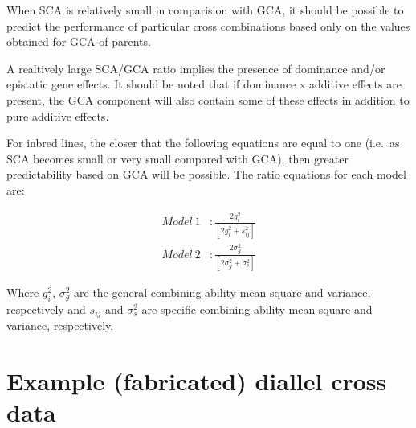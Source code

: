 \documentclass[11pt,dvipsnames,ignorenonframetext,aspectratio=169]{beamer}
\begin{document}
\begin{frame}{}
\protect\hypertarget{section-15}{}
\footnotesize

When SCA is relatively small in comparision with GCA, it should be
possible to predict the performance of particular cross combinations
based only on the values obtained for GCA of parents.

A realtively large SCA/GCA ratio implies the presence of dominance
and/or epistatic gene effects. It should be noted that if dominance x
additive effects are present, the GCA component will also contain some
of these effects in addition to pure additive effects.

For inbred lines, the closer that the following equations are equal to
one (i.e.~as SCA becomes small or very small compared with GCA), then
greater predictability based on GCA will be possible. The ratio
equations for each model are:

\[
\begin{aligned}
Model~1 &: \frac{2g_i^2}{[2g_i^2 + s_{ij}^2]} \\
Model~2 &: \frac{2\sigma_g^2}{[2\sigma_g^2 + \sigma_s^2]}
\end{aligned}
\]

Where \(g_i^2\), \(\sigma_g^2\) are the general combining ability mean
square and variance, respectively and \(s_{ij}\) and \(\sigma_s^2\) are
specific combining ability mean square and variance, respectively.
\end{frame}

\hypertarget{example-fabricated-diallel-cross-data}{%
\section{Example (fabricated) diallel cross
data}\label{example-fabricated-diallel-cross-data}}
\end{document}
